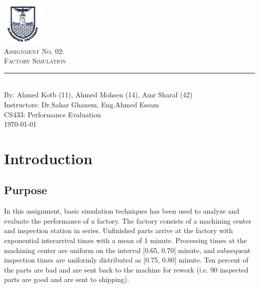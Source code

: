 \documentclass[aps,letterpaper,10pt]{revtex4}
\newcommand{\labno}{02}
\newcommand{\labtitle}{Factory Simulation}
\newcommand{\authorname}{Ahmed Kotb (11), Ahmed Mohsen (14), Amr Sharaf (42)}
\newcommand{\professor}{Dr.Sahar Ghanem, Eng.Ahmed Essam}
\newcommand{\classno}{CS433: Performance Evaluation}
\begin{document}


\begin{titlepage}
\begin{center}
\includegraphics[width=2cm]{Logo_Alexandria_University.jpg}\\
{\LARGE \textsc{Assignment No. \labno:} \\ \vspace{4pt}}
{\Large \textsc{\labtitle} \\ \vspace{4pt}} 
\rule[13pt]{\textwidth}{1pt} \\ \vspace{150pt}
{\large By: \authorname \\ \vspace{10pt}
Instructors: \professor \\ \vspace{10pt}
\classno \\ \vspace{10pt}
\today}
\end{center}
\end{titlepage}
\tableofcontents
\newpage


\section{Introduction}
\subsection{Purpose}
In this assignment, basic simulation techniques has been used to analyze and evaluate the performance of a factory. The factory consists of a machining center and inspection station in series. Unfinished parts arrive at the factory with exponential interarrival times with a mean of 1 minute. Processing times at the machining center are uniform on the interval [0.65, 0.70] minute, and subsequent inspection times are uniformly distributed as [0.75, 0.80] minute. Ten percent of the parts are bad and are sent back to the machine for rework (i.e. 90%
inspected parts are good and are sent to shipping).
\end{document}
